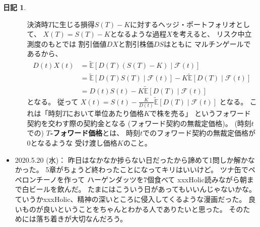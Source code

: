 \documentclass[uplatex]{jsarticle}
\theoremstyle{definition}
\newtheorem*{nikki*}{日記}
\def\E{\mathbb{E}}
\def\mcF{\mathcal{F}}
\begin{document}
\begin{nikki*}
\begin{itemize}
\begin{itemize}
      決済時\(T\)に生じる損得\(S(T)-K\)に対するヘッジ・ポートフォリオとして、
      \(X(T)=S(T)-K\)となるような過程\(X\)を考えると、
      リスク中立測度のもとでは
      割引価値\(DX\)と割引株価\(DS\)はともに
      マルチンゲールであるから、
      \begin{align*}
        D(t)X(t) &= \tilde{\E}[D(T)(S(T)-K) \mid \mcF(t)] \\
        &= \tilde{\E}[D(T)S(T)\mid\mcF(t)]
        - K\tilde{\E}[D(T)\mid\mcF(t)] \\
        &= D(t)S(t) - K\tilde{\E}[D(T)\mid\mcF(t)]
      \end{align*}
      となる。
      従って
      \(X(t) = S(t) - \frac{K}{D(t)}\tilde{\E}[D(T)\mid\mcF(t)]\)
      となる。
      これは「時刻\(T\)において単位あたり価格\(K\)で株を売る」
      というフォワード契約を交わす際の契約金となる
      (フォワード契約の無裁定価格)。
      (時刻\(t\)での)
      \textbf{\(T\)-フォワード価格}とは、
      時刻\(t\)でのフォワード契約の無裁定価格が\(0\)となるような
      受け渡し価格\(K\)のこと。
    \end{itemize}
    \item
    2020.5.20 (水)：
    昨日はなかなか捗らない日だったから諦めて1問しか解かなかった。
    5章がちょうど終わったことになってキリはいいけど。
    ツナ缶でペペロンチーノを作って
    ハーゲンダッツを7個食べて
    xxxHolic読みながら朝まで白ビールを飲んだ。
    たまにはこういう日があってもいいんじゃないかな。
    ていうかxxxHolic、精神の深いところに侵入してくるような漫画だった。
    良いものが良いということをちゃんとわかる人でありたいと思った。
    そのためには落ち着きが大切なんだろう。


\end{itemize}
\end{nikki*}
\end{document}
